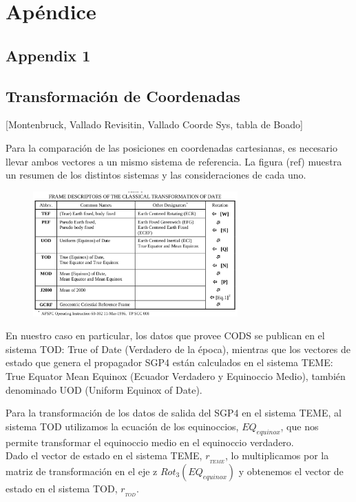 \chapter{Ap\'endice}
\section{Appendix 1}
\label{App1}

\section{Transformaci\'on de Coordenadas}
[Montenbruck, Vallado Revisitin, Vallado Coorde Sys, tabla de Boado]

Para la comparaci\'on de las posiciones en coordenadas cartesianas, es necesario llevar ambos vectores a un mismo sistema de referencia.
La figura (ref) muestra un resumen de los distintos sistemas y las consideraciones de cada uno. 

\begin{figure}[!h]
  \centering
  \includegraphics[width=0.7\textwidth]{imagenes/sistReferencias}
\end{figure}

En nuestro caso en particular, los datos que provee CODS se publican en el sistema TOD: True of Date (Verdadero de la \'epoca), mientras que los vectores de estado que genera el propagador SGP4 est\'an calculados en el sistema TEME: True Equator Mean Equinox (Ecuador Verdadero y Equinoccio Medio), tambi\'en denominado UOD (Uniform Equinox of Date).

Para la transformaci\'on de los datos de salida del SGP4 en el sistema TEME, al sistema TOD utilizamos la ecuaci\'on de los equinoccios, $EQ_{equinox}$, que nos permite transformar el equinoccio medio en el equinoccio verdadero.\\
Dado el vector de estado en el sistema TEME, $r_{_{TEME}}$, lo multiplicamos por la matriz de transformaci\'on en el eje z $Rot_{3}(EQ_{equinox})$ y obtenemos el vector de estado en el sistema TOD, $r_{_{TOD}}$.

